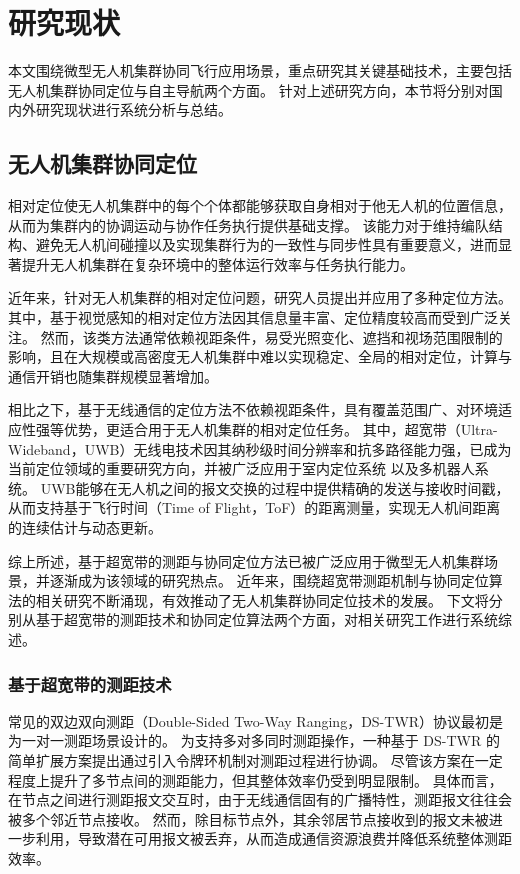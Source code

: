 \chapter{研究现状}
本文围绕微型无人机集群协同飞行应用场景，重点研究其关键基础技术，主要包括无人机集群协同定位与自主导航两个方面。
针对上述研究方向，本节将分别对国内外研究现状进行系统分析与总结。

\section{无人机集群协同定位}
相对定位使无人机集群中的每个个体都能够获取自身相对于他无人机的位置信息，从而为集群内的协调运动与协作任务执行提供基础支撑。
该能力对于维持编队结构、避免无人机间碰撞以及实现集群行为的一致性与同步性具有重要意义，进而显著提升无人机集群在复杂环境中的整体运行效率与任务执行能力。

近年来，针对无人机集群的相对定位问题，研究人员提出并应用了多种定位方法。其中，基于视觉感知的相对定位方法因其信息量丰富、定位精度较高而受到广泛关注\cite{lucahigh,yin2025iloc}。
然而，该类方法通常依赖视距条件，易受光照变化、遮挡和视场范围限制的影响，且在大规模或高密度无人机集群中难以实现稳定、全局的相对定位，计算与通信开销也随集群规模显著增加。

相比之下，基于无线通信的定位方法不依赖视距条件，具有覆盖范围广、对环境适应性强等优势，更适合用于无人机集群的相对定位任务。
其中，超宽带（Ultra-Wideband，UWB）无线电技术因其纳秒级时间分辨率和抗多路径能力强，已成为当前定位领域的重要研究方向，并被广泛应用于室内定位系统\cite{chiasson2023asynchronous,
yang2022vuloc,kim2022uwb,zhao2022finding,domuta2021two,cano2022clock,ayman2022calibration}
以及多机器人系统\cite{cano2023ranging, nguyen2023relative,jia2023distributed,liu2023relative}。
UWB能够在无人机之间的报文交换的过程中提供精确的发送与接收时间戳，从而支持基于飞行时间（Time of Flight，ToF）的距离测量，实现无人机间距离的连续估计与动态更新。

综上所述，基于超宽带的测距与协同定位方法已被广泛应用于微型无人机集群场景，并逐渐成为该领域的研究热点。
近年来，围绕超宽带测距机制与协同定位算法的相关研究不断涌现，有效推动了无人机集群协同定位技术的发展。
下文将分别从基于超宽带的测距技术和协同定位算法两个方面，对相关研究工作进行系统综述。

\subsection{基于超宽带的测距技术}


常见的双边双向测距（Double-Sided Two-Way Ranging，DS-TWR）协议最初是为一对一测距场景设计的。
为支持多对多同时测距操作，一种基于 DS-TWR 的简单扩展方案\cite{bux2005chapter}提出通过引入令牌环机制对测距过程进行协调。
尽管该方案在一定程度上提升了多节点间的测距能力，但其整体效率仍受到明显限制。
具体而言，在节点之间进行测距报文交互时，由于无线通信固有的广播特性，测距报文往往会被多个邻近节点接收。
然而，除目标节点外，其余邻居节点接收到的报文未被进一步利用，导致潜在可用报文被丢弃，从而造成通信资源浪费并降低系统整体测距效率。


